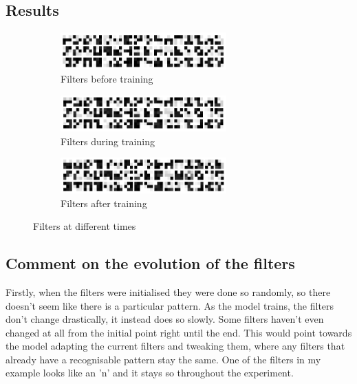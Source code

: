 \documentclass{article}
\begin{document}
    \subsection{Results}
    \begin{figure}[h!]
        \centering
        \begin{subfigure}[t]{0.7\textwidth}
            \centering
            \includegraphics[width=0.7\textwidth]{Filters_before}
            \caption{Filters before training}
        \end{subfigure}
        \begin{subfigure}[t]{0.7\textwidth}
            \centering
            \includegraphics[width=0.7\textwidth]{Filters_during}
            \caption{Filters during training}
        \end{subfigure}
        \begin{subfigure}[t]{0.7\textwidth}
            \centering
            \includegraphics[width=0.7\textwidth]{Filters_after}
            \caption{Filters after training}
        \end{subfigure}
        \caption{Filters at different times}
    \end{figure}

    \subsection{Comment on the evolution of the filters}

    Firstly, when the filters were initialised they were done so randomly, so there doesn't seem like there is a particular pattern. As the model trains, the filters don't change drastically, it instead does so slowly. Some filters haven't even changed at all from the initial point right until the end. This would point towards the model adapting the current filters and tweaking them, where any filters that already have a recognisable pattern stay the same. One of the filters in my example looks like an 'n' and it stays so throughout the experiment.\\
\end{document}
